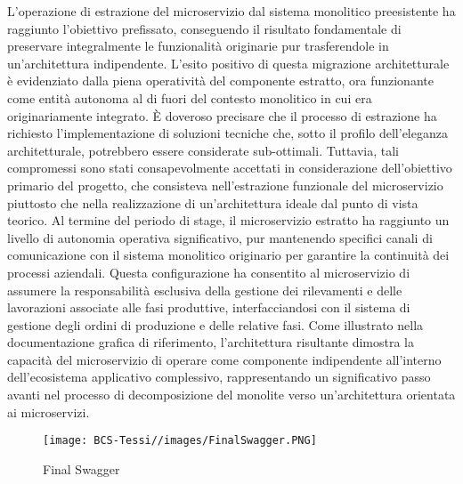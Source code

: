         L'operazione di estrazione del microservizio dal sistema monolitico preesistente ha raggiunto l'obiettivo prefissato, conseguendo il risultato fondamentale di preservare integralmente le funzionalità originarie pur trasferendole in un'architettura indipendente. L'esito positivo di questa migrazione architetturale è evidenziato dalla piena operatività del componente estratto, ora funzionante come entità autonoma al di fuori del contesto monolitico in cui era originariamente integrato.
È doveroso precisare che il processo di estrazione ha richiesto l'implementazione di soluzioni tecniche che, sotto il profilo dell'eleganza architetturale, potrebbero essere considerate sub-ottimali. Tuttavia, tali compromessi sono stati consapevolmente accettati in considerazione dell'obiettivo primario del progetto, che consisteva nell'estrazione funzionale del microservizio piuttosto che nella realizzazione di un'architettura ideale dal punto di vista teorico.
Al termine del periodo di stage, il microservizio estratto ha raggiunto un livello di autonomia operativa significativo, pur mantenendo specifici canali di comunicazione con il sistema monolitico originario per garantire la continuità dei processi aziendali. Questa configurazione ha consentito al microservizio di assumere la responsabilità esclusiva della gestione dei rilevamenti e delle lavorazioni associate alle fasi produttive, interfacciandosi con il sistema di gestione degli ordini di produzione e delle relative fasi.
Come illustrato nella documentazione grafica di riferimento, l'architettura risultante dimostra la capacità del microservizio di operare come componente indipendente all'interno dell'ecosistema applicativo complessivo, rappresentando un significativo passo avanti nel processo di decomposizione del monolite verso un'architettura orientata ai microservizi.

        \begin{figure}[H]
            \centering
            \texttt{[image: BCS-Tessi//images/FinalSwagger.PNG]}
            \caption{Final Swagger}
            \label{fig:final-Swagger}
        \end{figure}
        
